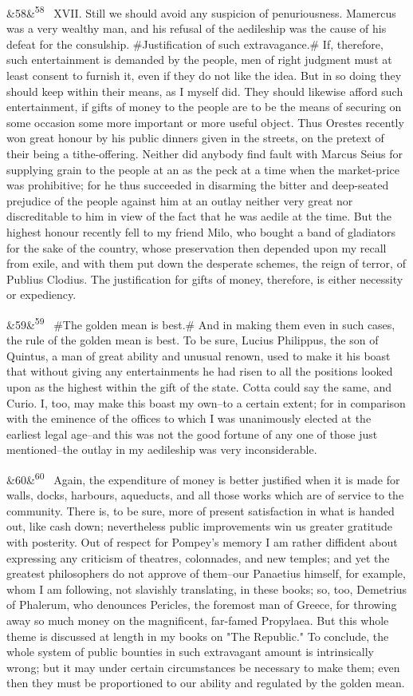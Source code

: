 \documentclass[12pt]{article}
\newcommand{\para}[1][]{\par\noindent\ifx&#1&\else\textsuperscript{\footnotesize #1}~\fi}
\begin{document}
\para[58] XVII. Still we should avoid any suspicion of penuriousness. Mamercus was a very wealthy man, and his refusal of the aedileship was the cause of his defeat for the consulship. \#Justification of such extravagance.\# If, therefore, such entertainment is demanded by the people, men of right judgment must at least consent to furnish it, even if they do not like the idea. But in so doing they should keep within their means, as I myself did. They should likewise afford such entertainment, if gifts of money to the people are to be the means of securing on some occasion some more important or more useful object. Thus Orestes recently won great honour by his public dinners given in the streets, on the pretext of their being a tithe-offering. Neither did anybody find fault with Marcus Seius for supplying grain to the people at an as the peck at a time when the market-price was prohibitive; for he thus succeeded in disarming the bitter and deep-seated prejudice of the people against him at an outlay neither very great nor discreditable to him in view of the fact that he was aedile at the time. But the highest honour recently fell to my friend Milo, who bought a band of gladiators for the sake of the country, whose preservation then depended upon my recall from exile, and with them put down the desperate schemes, the reign of terror, of Publius Clodius. The justification for gifts of money, therefore, is either necessity or expediency.

\para[59] \#The golden mean is best.\# And in making them even in such cases, the rule of the golden mean is best. To be sure, Lucius Philippus, the son of Quintus, a man of great ability and unusual renown, used to make it his boast that without giving any entertainments he had risen to all the positions looked upon as the highest within the gift of the state. Cotta could say the same, and Curio. I, too, may make this boast my own--to a certain extent; for in comparison with the eminence of the offices to which I was unanimously elected at the earliest legal age--and this was not the good fortune of any one of those just mentioned--the outlay in my aedileship was very inconsiderable.

\para[60] Again, the expenditure of money is better justified when it is made for walls, docks, harbours, aqueducts, and all those works which are of service to the community. There is, to be sure, more of present satisfaction in what is handed out, like cash down; nevertheless public improvements win us greater gratitude with posterity. Out of respect for Pompey's memory I am rather diffident about expressing any criticism of theatres, colonnades, and new temples; and yet the greatest philosophers do not approve of them--our Panaetius himself, for example, whom I am following, not slavishly translating, in these books; so, too, Demetrius of Phalerum, who denounces Pericles, the foremost man of Greece, for throwing away so much money on the magnificent, far-famed Propylaea. But this whole theme is discussed at length in my books on "The Republic." To conclude, the whole system of public bounties in such extravagant amount is intrinsically wrong; but it may under certain circumstances be necessary to make them; even then they must be proportioned to our ability and regulated by the golden mean.
\end{document}
